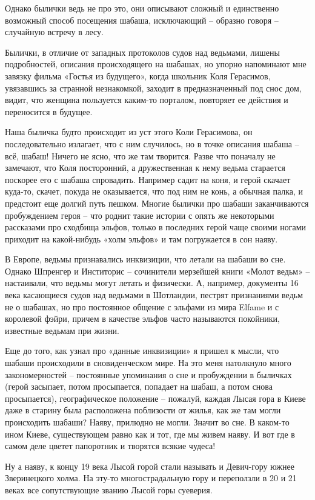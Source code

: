 Однако былички ведь не про это, они описывают сложный и единственно возможный способ посещения шабаша, исключающий – образно говоря – случайную встречу в лесу.

Былички, в отличие от западных протоколов судов над ведьмами, лишены подробностей, описания происходящего на шабашах, но упорно напоминают мне завязку фильма «Гостья из будущего», когда школьник Коля Герасимов, увязавшись за странной незнакомкой, заходит в предназначенный под снос дом, видит, что женщина пользуется каким-то порталом, повторяет ее действия и переносится в будущее.

Наша быличка будто происходит из уст этого Коли Герасимова, он последовательно излагает, что с ним случилось, но в точке описания шабаша – всё, шабаш! Ничего не ясно, что же там творится. Разве что поначалу не замечают, что Коля посторонний, а дружественная к нему ведьма старается поскорее его с шабаша спровадить. Например садит на коня, и герой скачает куда-то, скачет, покуда не оказывается, что под ним не конь, а обычная палка, и предстоит еще долгий путь пешком. Многие былички про шабаши заканчиваются пробуждением героя – что роднит такие истории с опять же некоторыми рассказами про сходбища эльфов, только в последних герой чаще своими ногами приходит на какой-нибудь «холм эльфов» и там погружается в сон наяву.

В Европе, ведьмы признавались инквизиции, что летали на шабаши во сне. Однако Шпренгер и Инститорис – сочинители мерзейшей книги «Молот ведьм» – настаивали, что ведьмы могут летать и физически. А, например, документы 16 века касающиеся судов над ведьмами в Шотландии, пестрят признаниями ведьм не о шабашах, но про постоянное общение с эльфами из мира Elfame и с королевой фэйри, причем в качестве эльфов часто называются покойники, известные ведьмам при жизни.

Еще до того, как узнал про «данные инквизиции» я пришел к мысли, что шабаши происходили в сновиденческом мире. На это меня натолкнуло много закономерностей – постоянные упоминания о сне и пробуждении в быличках (герой засыпает, потом просыпается, попадает на шабаш, а потом снова просыпается), географическое положение – пожалуй, каждая Лысая гора в Киеве даже в старину была расположена поблизости от жилья, как же там могли происходить шабаши? Наяву, прилюдно не могли. Значит во сне. В каком-то ином Киеве, существующем равно как и тот, где мы живем наяву. И вот где в самом деле цветет папоротник и творятся всякие чудеса!



Ну а наяву, к концу 19 века Лысой горой стали называть и Девич-гору южнее Зверинецкого холма. На эту-то многострадальную гору и переползли в 20 и 21 веках все сопутствующие званию Лысой горы суеверия.
